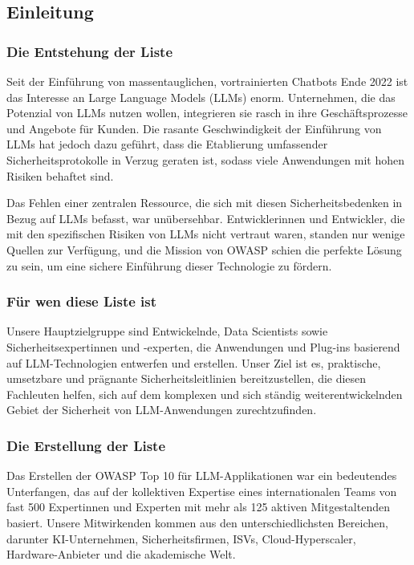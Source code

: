 \documentclass[
]{article}
\author{}
\date{}
\begin{document}
\subsection{Einleitung}\label{einleitung}

\subsubsection{Die Entstehung der Liste}\label{die-entstehung-der-liste}

Seit der Einführung von massentauglichen, vortrainierten Chatbots Ende
2022 ist das Interesse an Large Language Models (LLMs) enorm.
Unternehmen, die das Potenzial von LLMs nutzen wollen, integrieren sie
rasch in ihre Geschäftsprozesse und Angebote für Kunden. Die rasante
Geschwindigkeit der Einführung von LLMs hat jedoch dazu geführt, dass
die Etablierung umfassender Sicherheitsprotokolle in Verzug geraten ist,
sodass viele Anwendungen mit hohen Risiken behaftet sind.

Das Fehlen einer zentralen Ressource, die sich mit diesen
Sicherheitsbedenken in Bezug auf LLMs befasst, war unübersehbar.
Entwicklerinnen und Entwickler, die mit den spezifischen Risiken von
LLMs nicht vertraut waren, standen nur wenige Quellen zur Verfügung, und
die Mission von OWASP schien die perfekte Lösung zu sein, um eine
sichere Einführung dieser Technologie zu fördern.

\subsubsection{Für wen diese Liste
ist}\label{fuxfcr-wen-diese-liste-ist}

Unsere Hauptzielgruppe sind Entwickelnde, Data Scientists sowie
Sicherheitsexpertinnen und -experten, die Anwendungen und Plug-ins
basierend auf LLM-Technologien entwerfen und erstellen. Unser Ziel ist
es, praktische, umsetzbare und prägnante Sicherheitsleitlinien
bereitzustellen, die diesen Fachleuten helfen, sich auf dem komplexen
und sich ständig weiterentwickelnden Gebiet der Sicherheit von
LLM-Anwendungen zurechtzufinden.

\subsubsection{Die Erstellung der Liste}\label{die-erstellung-der-liste}

Das Erstellen der OWASP Top 10 für LLM-Applikationen war ein bedeutendes
Unterfangen, das auf der kollektiven Expertise eines internationalen
Teams von fast 500 Expertinnen und Experten mit mehr als 125 aktiven
Mitgestaltenden basiert. Unsere Mitwirkenden kommen aus den
unterschiedlichsten Bereichen, darunter KI-Unternehmen,
Sicherheitsfirmen, ISVs, Cloud-Hyperscaler, Hardware-Anbieter und die
akademische Welt.
\end{document}
